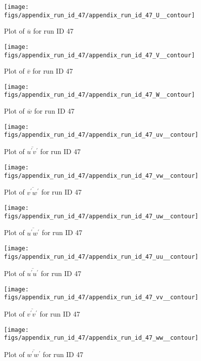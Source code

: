 \begin{figure}[H]
\centering
\texttt{[image: figs/appendix\_run\_id\_47/appendix\_run\_id\_47\_U\_\_contour]}
\caption{Plot of $\overline{u}$ for run ID 47}
\label{fig:appendix_run_id_47_U__contour}
\end{figure}


\begin{figure}[H]
\centering
\texttt{[image: figs/appendix\_run\_id\_47/appendix\_run\_id\_47\_V\_\_contour]}
\caption{Plot of $\overline{v}$ for run ID 47}
\label{fig:appendix_run_id_47_V__contour}
\end{figure}


\begin{figure}[H]
\centering
\texttt{[image: figs/appendix\_run\_id\_47/appendix\_run\_id\_47\_W\_\_contour]}
\caption{Plot of $\overline{w}$ for run ID 47}
\label{fig:appendix_run_id_47_W__contour}
\end{figure}


\begin{figure}[H]
\centering
\texttt{[image: figs/appendix\_run\_id\_47/appendix\_run\_id\_47\_uv\_\_contour]}
\caption{Plot of $\overline{u^\prime v^\prime}$ for run ID 47}
\label{fig:appendix_run_id_47_uv__contour}
\end{figure}


\begin{figure}[H]
\centering
\texttt{[image: figs/appendix\_run\_id\_47/appendix\_run\_id\_47\_vw\_\_contour]}
\caption{Plot of $\overline{v^\prime w^\prime}$ for run ID 47}
\label{fig:appendix_run_id_47_vw__contour}
\end{figure}


\begin{figure}[H]
\centering
\texttt{[image: figs/appendix\_run\_id\_47/appendix\_run\_id\_47\_uw\_\_contour]}
\caption{Plot of $\overline{u^\prime w^\prime}$ for run ID 47}
\label{fig:appendix_run_id_47_uw__contour}
\end{figure}


\begin{figure}[H]
\centering
\texttt{[image: figs/appendix\_run\_id\_47/appendix\_run\_id\_47\_uu\_\_contour]}
\caption{Plot of $\overline{u^\prime u^\prime}$ for run ID 47}
\label{fig:appendix_run_id_47_uu__contour}
\end{figure}


\begin{figure}[H]
\centering
\texttt{[image: figs/appendix\_run\_id\_47/appendix\_run\_id\_47\_vv\_\_contour]}
\caption{Plot of $\overline{v^\prime v^\prime}$ for run ID 47}
\label{fig:appendix_run_id_47_vv__contour}
\end{figure}


\begin{figure}[H]
\centering
\texttt{[image: figs/appendix\_run\_id\_47/appendix\_run\_id\_47\_ww\_\_contour]}
\caption{Plot of $\overline{w^\prime w^\prime}$ for run ID 47}
\label{fig:appendix_run_id_47_ww__contour}
\end{figure}



